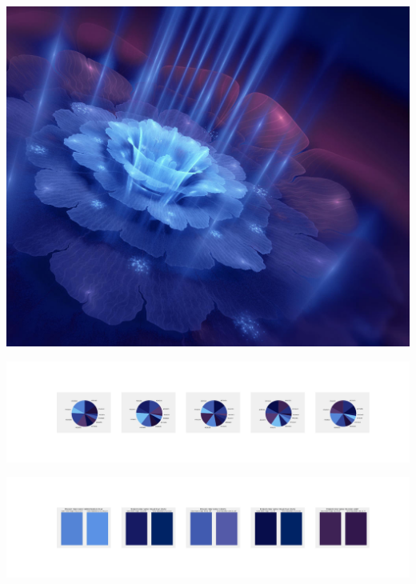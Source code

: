 \documentclass[11pt]{article}
\begin{document}
\begin{landscape}
    \begin{center}
    \includegraphics[width=\textwidth]{./nbimg/file (163).jpg}
    \end{center}

    \begin{center}
    \includegraphics[width=250mm]{./nbimg/pie-71.jpg}
    \end{center}

    \begin{center}
    \includegraphics[width=250mm]{./nbimg/peak-71.jpg}
    \end{center}
    


\end{landscape}
\end{document}
